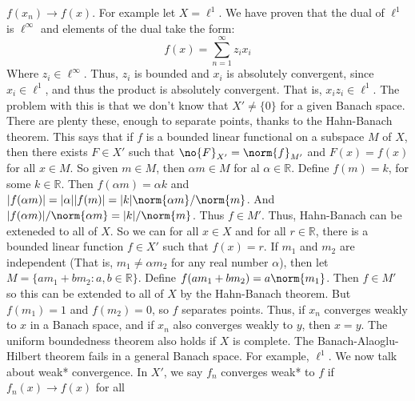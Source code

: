 \documentclass[crop=false,class=book,oneside]{standalone}
\begin{document}
            $f(x_{n})\rightarrow{f(x)}$.
            For example let $X=\ell^{1}$. We have proven that the
            dual of $\ell^{1}$ is $\ell^{\infty}$ and elements
            of the dual take the form:
            \begin{equation}
                f(x)=\sum_{n=1}^{\infty}z_{i}x_{i}
            \end{equation}
            Where $z_{i}\in\ell^{\infty}$. Thus, $z_{i}$ is
            bounded and $x_{i}$ is absolutely convergent,
            since $x_{i}\in\ell^{1}$, and thus the product
            is absolutely convergent. That is,
            $x_{i}z_{i}\in\ell^{1}$. The problem with this is
            that we don't know that $X'\ne\{0\}$ for a given
            Banach space. There are plenty these, enough to
            separate points, thanks to the Hahn-Banach theorem.
            This says that if $f$ is a bounded linear functional
            on a subspace $M$ of $X$, then there exists
            $F\in{X'}$ such that
            $\no{F}_{X'}=\norm{f}_{M'}$ and
            $F(x)=f(x)$ for all $x\in{M}$. So given $m\in{M}$,
            then $\alpha{m}\in{M}$ for al $\alpha\in\mathbb{R}$.
            Define $f(m)=k$, for some $k\in\mathbb{R}$. Then
            $f(\alpha{m})=\alpha{k}$ and
            $|f(\alpha{m})|=|\alpha||f(m)|%
             =|k|\norm{\alpha{m}}/\norm{m}$. And
             $|f(\alpha{m})|/\norm{\alpha{m}}=|k|/\norm{m}$.
            Thus $f\in{M'}$. Thus, Hahn-Banach can be exteneded
            to all of $X$. So we can for all $x\in{X}$ and for
            all $r\in\mathbb{R}$, there is a bounded linear
            function $f\in{X'}$ such that
            $f(x)=r$. If $m_{1}$ and $m_{2}$ are independent
            (That is, $m_{1}\ne\alpha{m}_{2}$ for any real
            number $\alpha$), then let
            $M=\{am_{1}+bm_{2}:a,b\in\mathbb{R}\}$. Define
            $f(am_{1}+bm_{2})=a\norm{m_{1}}$.
            Then $f\in{M'}$ so this
            can be extended to all of $X$ by the Hahn-Banach
            theorem. But $f(m_{1})=1$ and
            $f(m_{2})=0$, so $f$ separates points. Thus,
            if $x_{n}$ converges weakly to $x$ in a
            Banach space, and if $x_{n}$ also converges weakly
            to $y$, then $x=y$. The uniform boundedness theorem
            also holds if $X$ is complete. The
            Banach-Alaoglu-Hilbert theorem fails in a general
            Banach space. For example, $\ell^{1}$. We now talk
            about weak* convergence. In $X'$, we say
            $f_{n}$ converges weak* to $f$ if
            $f_{n}(x)\rightarrow{f(x)}$ for all
\end{document}
